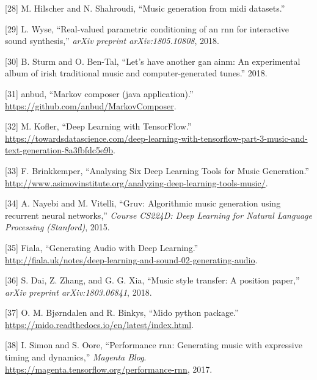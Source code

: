 \documentclass[12pt,]{article}
\begin{document}
\leavevmode\hypertarget{ref-hilschermusic}{}%
{[}28{]} M. Hilscher and N. Shahroudi, ``Music generation from midi
datasets.''

\leavevmode\hypertarget{ref-wyse2018real}{}%
{[}29{]} L. Wyse, ``Real-valued parametric conditioning of an rnn for
interactive sound synthesis,'' \emph{arXiv preprint arXiv:1805.10808},
2018.

\leavevmode\hypertarget{ref-sturm2018let}{}%
{[}30{]} B. Sturm and O. Ben-Tal, ``Let's have another gan ainm: An
experimental album of irish traditional music and computer-generated
tunes.'' 2018.

\leavevmode\hypertarget{ref-markovcomposer}{}%
{[}31{]} \relax anbud, ``Markov composer (java application).'' \\
\url{https://github.com/anbud/MarkovComposer}.

\leavevmode\hypertarget{ref-mkofler}{}%
{[}32{]} M. Kofler, ``Deep Learning with TensorFlow.'' \\
\url{https://towardsdatascience.com/deep-learning-with-tensorflow-part-3-music-and-text-generation-8a3fbfdc5e9b}.

\leavevmode\hypertarget{ref-asimovinst}{}%
{[}33{]} F. Brinkkemper, ``Analysing Six Deep Learning Tools for Music
Generation.'' \\
\url{http://www.asimovinstitute.org/analyzing-deep-learning-tools-music/}.

\leavevmode\hypertarget{ref-nayebi2015gruv}{}%
{[}34{]} A. Nayebi and M. Vitelli, ``Gruv: Algorithmic music generation
using recurrent neural networks,'' \emph{Course CS224D: Deep Learning
for Natural Language Processing (Stanford)}, 2015.

\leavevmode\hypertarget{ref-fiala}{}%
{[}35{]} \relax Fiala, ``Generating Audio with Deep Learning.'' \\
\url{http://fiala.uk/notes/deep-learning-and-sound-02-generating-audio}.

\leavevmode\hypertarget{ref-dai2018music}{}%
{[}36{]} S. Dai, Z. Zhang, and G. G. Xia, ``Music style transfer: A
position paper,'' \emph{arXiv preprint arXiv:1803.06841}, 2018.

\leavevmode\hypertarget{ref-mido}{}%
{[}37{]} O. M. Bjørndalen and R. Binkys, ``Mido python package.'' \\
\url{https://mido.readthedocs.io/en/latest/index.html}.

\leavevmode\hypertarget{ref-performance-rnn-2017}{}%
{[}38{]} I. Simon and S. Oore, ``Performance rnn: Generating music with
expressive timing and dynamics,'' \emph{Magenta Blog}.
\url{https://magenta.tensorflow.org/performance-rnn}, 2017.
\end{document}
